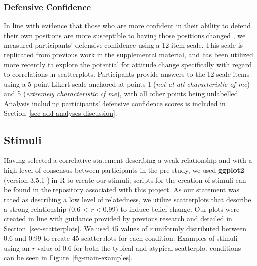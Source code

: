 \documentclass[manuscript,screen,review,anonymous]{acmart}
\begin{document}
\subsubsection{Defensive Confidence}\label{sec-def-con}

In line with evidence that those who are more confident in their ability
to defend their own positions are more susceptible to having those
positions changed \citep{albarracin_2004}, we measured participants'
defensive confidence using a 12-item scale. This scale is replicated
from previous work in the supplemental material, and has been utilized
more recently \citep{markant_2023} to explore the potential for attitude
change specifically with regard to correlations in scatterplots.
Participants provide answers to the 12 scale items using a 5-point
Likert scale anchored at points 1 (\emph{not at all characteristic of
me}) and 5 (\emph{extremely characteristic of me}), with all other
points being unlabelled. Analysis including participants' defensive
confidence scores is included in
Section~\ref{sec-add-analyses-discussion}.

\subsection{Stimuli}\label{sec-stimuli-main}

Having selected a correlative statement describing a weak relationship
and with a high level of consensus between participants in the
pre-study, we used \textbf{ggplot2} (version 3.5.1 \citep{ggplot}) in R
to create our stimuli; scripts for the creation of stimuli can be found
in the repository associated with this project. As our statement was
rated as describing a low level of relatedness, we utilize scatterplots
that describe a strong relationship (0.6 \textless{} \emph{r}
\textless{} 0.99) to induce belief change. Our plots were created in
line with guidance provided by previous research and detailed in
Section~\ref{sec-scatterplots}. We used 45 values of \emph{r} uniformly
distributed between 0.6 and 0.99 to create 45 scatterplots for each
condition. Examples of stimuli using an \emph{r} value of 0.6 for both
the typical and atypical scatterplot conditions can be seen in
Figure~\ref{fig-main-examples}.
\end{document}
